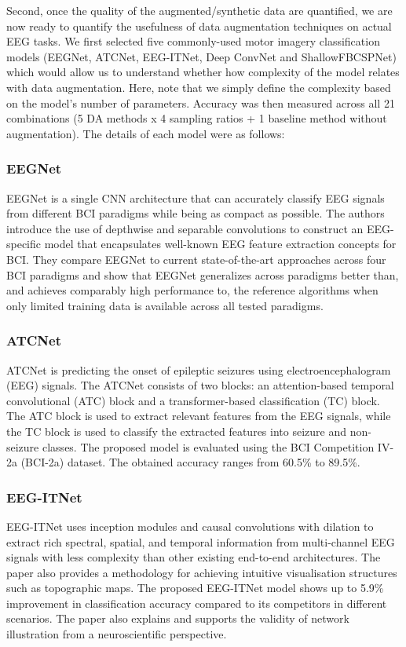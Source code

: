 \documentclass[runningheads]{llncs}
\begin{document}
Second, once the quality of the augmented/synthetic data are quantified, we are now ready to quantify the usefulness of data augmentation techniques on actual EEG tasks.  We first selected five commonly-used motor imagery classification models (EEGNet, ATCNet, EEG-ITNet, Deep ConvNet and ShallowFBCSPNet) which would allow us to understand whether how complexity of the model relates with data augmentation.  Here, note that we simply define the complexity based on the model's number of parameters. Accuracy was then measured across all 21 combinations (5 DA methods x 4 sampling ratios + 1 baseline method without augmentation).  The details of each model were as follows:

\subsubsection{EEGNet}
EEGNet is a single CNN architecture that can accurately classify EEG signals from different BCI paradigms while being as compact as possible. The authors introduce the use of depthwise and separable convolutions to construct an EEG-specific model that encapsulates well-known EEG feature extraction concepts for BCI. They compare EEGNet to current state-of-the-art approaches across four BCI paradigms and show that EEGNet generalizes across paradigms better than, and achieves comparably high performance to, the reference algorithms when only limited training data is available across all tested paradigms.

\subsubsection{ATCNet}
ATCNet is predicting the onset of epileptic seizures using electroencephalogram (EEG) signals. The ATCNet consists of two blocks: an attention-based temporal convolutional (ATC) block and a transformer-based classification (TC) block. The ATC block is used to extract relevant features from the EEG signals, while the TC block is used to classify the extracted features into seizure and non-seizure classes. The proposed model is evaluated using the BCI Competition IV-2a (BCI-2a) dataset. The obtained accuracy ranges from 60.5\% to 89.5\%.


\subsubsection{EEG-ITNet}
EEG-ITNet uses inception modules and causal convolutions with dilation to extract rich spectral, spatial, and temporal information from multi-channel EEG signals with less complexity than other existing end-to-end architectures. The paper also provides a methodology for achieving intuitive visualisation structures such as topographic maps. The proposed EEG-ITNet model shows up to 5.9\% improvement in classification accuracy compared to its competitors in different scenarios. The paper also explains and supports the validity of network illustration from a neuroscientific perspective. 
\end{document}
